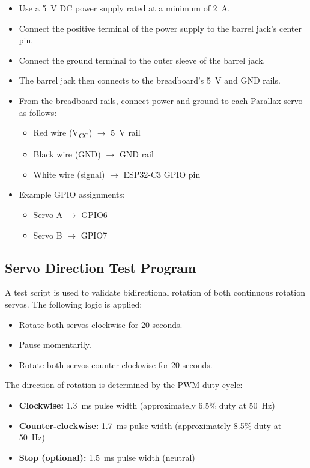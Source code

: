 \documentclass[conference]{IEEEtran}
\begin{document}
\begin{itemize}
    \item Use a 5~V DC power supply rated at a minimum of 2~A.
    \item Connect the positive terminal of the power supply to the barrel jack's center pin.
    \item Connect the ground terminal to the outer sleeve of the barrel jack.
    \item The barrel jack then connects to the breadboard's 5~V and GND rails.
    \item From the breadboard rails, connect power and ground to each Parallax servo as follows:
    \begin{itemize}
        \item Red wire (V\textsubscript{CC}) $\rightarrow$ 5~V rail
        \item Black wire (GND) $\rightarrow$ GND rail
        \item White wire (signal) $\rightarrow$ ESP32-C3 GPIO pin
    \end{itemize}
    \item Example GPIO assignments:
    \begin{itemize}
        \item Servo A $\rightarrow$ GPIO6
        \item Servo B $\rightarrow$ GPIO7
    \end{itemize}
\end{itemize}

\subsection{Servo Direction Test Program}

A test script is used to validate bidirectional rotation of both continuous rotation servos. The following logic is applied:

\begin{itemize}
    \item Rotate both servos clockwise for 20 seconds.
    \item Pause momentarily.
    \item Rotate both servos counter-clockwise for 20 seconds.
\end{itemize}

The direction of rotation is determined by the PWM duty cycle:

\begin{itemize}
    \item \textbf{Clockwise:} 1.3~ms pulse width (approximately 6.5\% duty at 50~Hz)
    \item \textbf{Counter-clockwise:} 1.7~ms pulse width (approximately 8.5\% duty at 50~Hz)
    \item \textbf{Stop (optional):} 1.5~ms pulse width (neutral)
\end{itemize}
\end{document}
